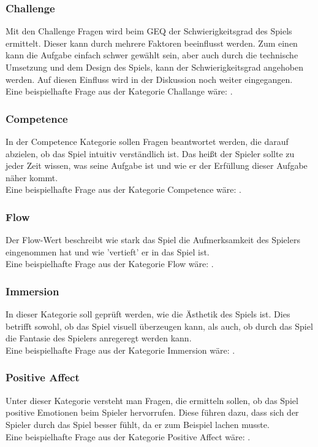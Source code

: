 \subsubsection{Challenge}
Mit den Challenge Fragen wird beim GEQ der Schwierigkeitsgrad des Spiels ermittelt. Dieser kann durch mehrere Faktoren beeinflusst werden. Zum einen kann die Aufgabe einfach schwer gewählt sein, aber auch durch die technische Umsetzung und dem Design des Spiels, kann der Schwierigkeitsgrad angehoben werden. Auf diesen Einfluss wird in der Diskussion noch weiter eingegangen.\\
Eine beispielhafte Frage aus der Kategorie Challange wäre: .
\subsubsection{Competence}
In der Competence Kategorie sollen Fragen beantwortet werden, die darauf abzielen, ob das Spiel intuitiv verständlich ist. Das heißt der Spieler sollte zu jeder Zeit wissen, was seine Aufgabe ist und wie er der Erfüllung dieser Aufgabe näher kommt.\\
Eine beispielhafte Frage aus der Kategorie Competence wäre: .
\subsubsection{Flow}
Der Flow-Wert beschreibt wie stark das Spiel die Aufmerksamkeit des Spielers eingenommen hat und wie 'vertieft'  er in das Spiel ist.\\
Eine beispielhafte Frage aus der Kategorie Flow wäre: .
\subsubsection{Immersion}
In dieser Kategorie soll geprüft werden, wie die Ästhetik des Spiels ist. Dies betrifft sowohl, ob das Spiel visuell überzeugen kann, als auch, ob durch das Spiel die Fantasie des Spielers anregeregt werden kann.
\\
Eine beispielhafte Frage aus der Kategorie Immersion wäre: .
\subsubsection{Positive Affect}
Unter dieser Kategorie versteht man Fragen, die ermitteln sollen, ob das Spiel positive Emotionen beim Spieler hervorrufen. Diese führen dazu, dass sich der Spieler durch das Spiel besser fühlt, da er zum Beispiel lachen musste.
\\
Eine beispielhafte Frage aus der Kategorie Positive Affect wäre: .
